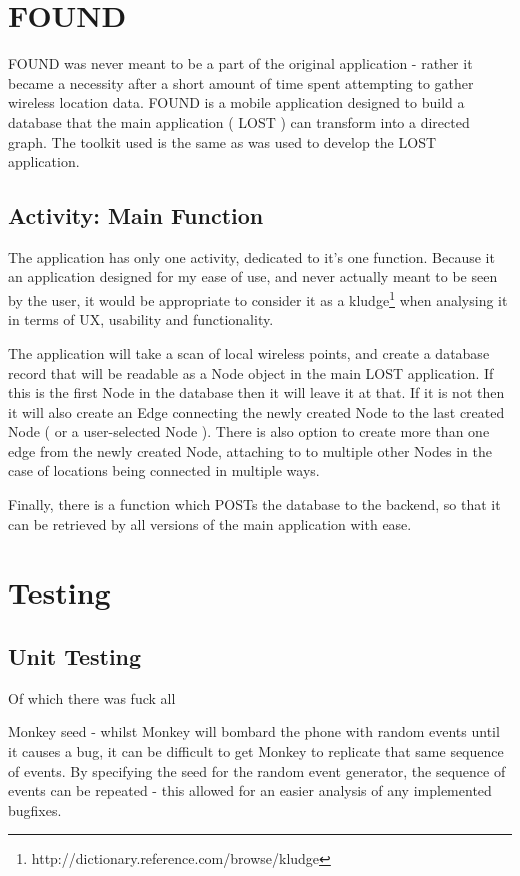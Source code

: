 \documentclass[11pt]{informatics-report}
\begin{document}
\section{FOUND}

FOUND was never meant to be a part of the original application - rather it became a necessity after a short amount of time spent attempting to gather wireless location data. FOUND is a mobile application designed to build a database that the main application ( LOST ) can transform into a directed graph. The toolkit used is the same as was used to develop the LOST application.

\subsection{Activity: Main Function}
The application has only one activity, dedicated to it's one function. Because it an application designed for my ease of use, and never actually meant to be seen by the user, it would be appropriate to consider it as a  kludge\footnote{http://dictionary.reference.com/browse/kludge} when analysing it in terms of UX, usability and functionality.

The application will take a scan of local wireless points, and create a database record that will be readable as a Node object in the main LOST application. If this is the first Node in the database then it will leave it at that. If it is not then it will also create an Edge connecting the newly created Node to the last created Node ( or a user-selected Node ). There is also option to create more than one edge from the newly created Node, attaching to to multiple other Nodes in the case of locations being connected in multiple ways.

Finally, there is a function which POSTs the database to the backend, so that it can be retrieved by all versions of the main application with ease.

\section{Testing}

\subsection{Unit Testing}

Of which there was fuck all

Monkey seed - whilst Monkey will bombard the phone with random events until it causes a bug, it can be difficult to get Monkey to replicate that same sequence of events. By specifying the seed for the random event generator, the sequence of events can be repeated - this allowed for an easier analysis of any implemented bugfixes. 
\end{document}
